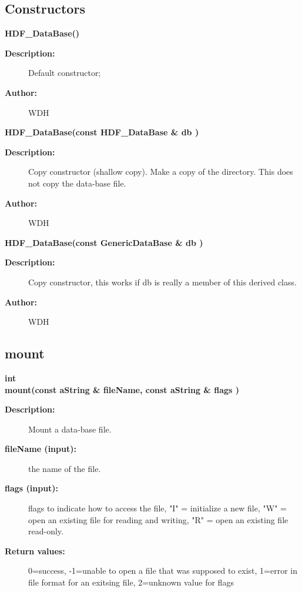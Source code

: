 \subsection{Constructors}
 
\newlength{\HDFDataBaseIncludeArgIndent}
\begin{flushleft} \textbf{%
\settowidth{\HDFDataBaseIncludeArgIndent}{HDF\_DataBase(}%
HDF\_DataBase()
}\end{flushleft}
\begin{description}
\item[{\bf Description:}] 
   Default constructor;
\item[{\bf Author:}]  WDH

\end{description}

 
\begin{flushleft} \textbf{%
\settowidth{\HDFDataBaseIncludeArgIndent}{HDF\_DataBase(}%
HDF\_DataBase(const HDF\_DataBase \& db )
}\end{flushleft}
\begin{description}
\item[{\bf Description:}] 
   Copy constructor (shallow copy).
   Make a copy of the directory. This does not copy the data-base file.
\item[{\bf Author:}]  WDH

\end{description}

 
\begin{flushleft} \textbf{%
\settowidth{\HDFDataBaseIncludeArgIndent}{HDF\_DataBase(}%
HDF\_DataBase(const GenericDataBase \& db )
}\end{flushleft}
\begin{description}
\item[{\bf Description:}] 
   Copy constructor, this works if db is really a member of this derived class.
\item[{\bf Author:}]  WDH

\end{description}
\subsection{mount}
 
\begin{flushleft} \textbf{%
int   \\ 
\settowidth{\HDFDataBaseIncludeArgIndent}{mount(}%
mount(const aString \& fileName, const aString \& flags )
}\end{flushleft}
\begin{description}
\item[{\bf Description:}] 
   Mount a data-base file.
\item[{\bf fileName (input):}]  the name of the file.
\item[{\bf flags (input):}]  flags to indicate how to access the file, "I" = initialize
   a new file, "W" = open an existing file for reading and writing,
   "R" = open an existing file read-only.
\item[{\bf Return values:}]  0=success, -1=unable to open a file that was supposed to exist,
     1=error in file format for an exitsing file, 2=unknown value for flags 
\end{description}
